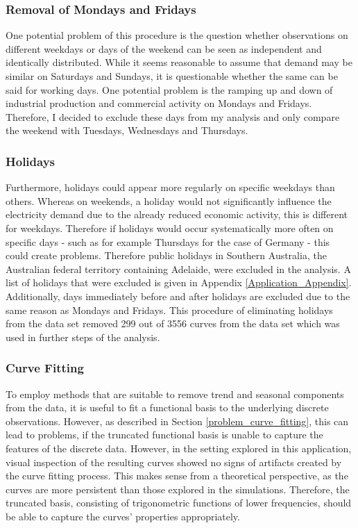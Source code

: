\documentclass[12pt, a4paper]{article}
\theoremstyle{MAstyle} \newtheorem{assumption}{Assumption}[section]
\theoremstyle{MAstyle} \newtheorem{definition}{Definition}[section]
\theoremstyle{MAstyle} \newtheorem{theorem}{Theorem}[section]
\begin{document}
			\subsubsection{Removal of Mondays and Fridays}
			One potential problem of this procedure is the question whether observations on different weekdays or days of the weekend can be seen as independent and identically distributed. While it seems reasonable to assume that demand may be similar on Saturdays and Sundays, it is questionable whether the same can be said for working days. 
			One potential problem is the ramping up and down of industrial production and commercial activity on Mondays and Fridays. Therefore, I decided to exclude these days from my analysis and only compare the weekend with Tuesdays, Wednesdays and Thursdays.
			
			\subsubsection{Holidays}
			Furthermore, holidays could appear more regularly on specific weekdays than others. Whereas on weekends, a holiday would not significantly influence the electricity demand due to the already reduced economic activity, this is different for weekdays. Therefore if holidays would occur systematically more often on specific days - such as for example Thursdays for the case of Germany - this could create problems. Therefore public holidays in Southern Australia, the Australian federal territory containing Adelaide, were excluded in the analysis. A list of holidays that were excluded is given in Appendix \ref{Application_Appendix}. Additionally, days immediately before and after holidays are excluded due to the same reason as Mondays and Fridays. This procedure of eliminating holidays from the data set removed 299 out of 3556 curves from the data set which was used in further steps of the analysis. 
			
			\subsubsection{Curve Fitting}
			To employ methods that are suitable to remove trend and seasonal components from the data, it is useful to fit a functional basis to the underlying discrete observations. However, as described in Section \ref{problem_curve_fitting}, this can lead to problems, if the truncated functional basis is unable to capture the features of the discrete data. However, in the setting explored in this application, visual inspection of the resulting curves showed no signs of artifacts created by the curve fitting process. This makes sense from a theoretical perspective, as the curves are more persistent than those explored in the simulations. Therefore, the truncated basis, consisting of trigonometric functions of lower frequencies, should be able to capture the curves' properties appropriately.
			
\end{document}
